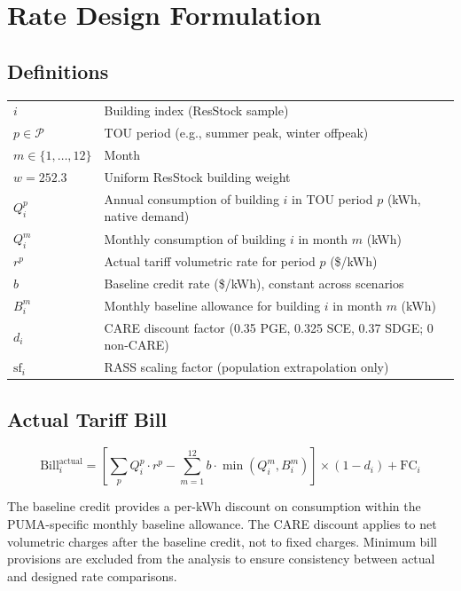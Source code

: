 \documentclass[9pt]{article}
\begin{document}
\section{Rate Design Formulation}
\label{sec:rate_design}

\subsection{Definitions}

\begin{tabular}{ll}
$i$ & Building index (ResStock sample) \\
$p \in \mathcal{P}$ & TOU period (e.g., summer peak, winter offpeak) \\
$m \in \{1, \ldots, 12\}$ & Month \\
$w = 252.3$ & Uniform ResStock building weight \\
$Q_i^p$ & Annual consumption of building $i$ in TOU period $p$ (kWh, native demand) \\
$Q_i^m$ & Monthly consumption of building $i$ in month $m$ (kWh) \\
$r^p$ & Actual tariff volumetric rate for period $p$ (\$/kWh) \\
$b$ & Baseline credit rate (\$/kWh), constant across scenarios \\
$B_i^m$ & Monthly baseline allowance for building $i$ in month $m$ (kWh) \\
$d_i$ & CARE discount factor (0.35 PGE, 0.325 SCE, 0.37 SDGE; 0 non-CARE) \\
$\text{sf}_i$ & RASS scaling factor (population extrapolation only) \\
\end{tabular}

\subsection{Actual Tariff Bill}

\begin{equation}
\text{Bill}_i^{\text{actual}} = \left[ \sum_p Q_i^p \cdot r^p - \sum_{m=1}^{12} b \cdot \min(Q_i^m, B_i^m) \right] \times (1 - d_i) + \text{FC}_i
\end{equation}

The baseline credit provides a per-kWh discount on consumption within the PUMA-specific monthly baseline allowance. The CARE discount applies to net volumetric charges after the baseline credit, not to fixed charges. Minimum bill provisions are excluded from the analysis to ensure consistency between actual and designed rate comparisons.
\end{document}
